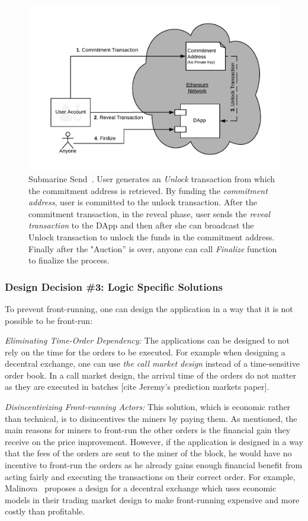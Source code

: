 \begin{figure}[h]
\centering
\includegraphics[width=0.5\linewidth]{figures/LibSubmarine.png}
\caption{ Submarine Send~\cite{libsubmarine}. User generates an \textit{Unlock} transaction from which the commitment address is retrieved. By funding the \textit{commitment address}, user is committed to the unlock transaction. After the commitment transaction, in the reveal phase, user sends the \textit{reveal transaction} to the DApp and then after she can broadcast the Unlock transaction to unlock the funds in the commitment address. Finally after the "Auction'' is over, anyone can call \textit{Finalize} function to finalize the process.  \label{fig:LibSubmarine}}
\end{figure}


\subsubsection{Design Decision \#3: Logic Specific Solutions\newline}
To prevent front-running, one can design the application in a way that it is not possible to be front-run:

\noindent\emph{Eliminating Time-Order Dependency:} The applications can be designed to not rely on the time for the orders to be executed. For example when designing a decentral exchange, one can use \emph{the call market design} instead of a time-sensitive order book. In a call market design, the arrival time of the orders do not matter as they are executed in batches [cite Jeremy's prediction markets paper]. 

\noindent\emph{Disincentivizing Front-running Actors:} This solution, which is economic rather than technical, is to disincentives the miners by paying them. As mentioned, the main reasons for miners to front-run the other orders is the financial gain they receive on the price improvement. However, if the application is designed in a way that the fees of the orders are sent to the miner of the block, he would have no incentive to front-run the orders as he already gains enough financial benefit from acting fairly and executing the transactions on their correct order. For example, Malinova~\cite{Malinova} proposes a design for a decentral exchange which uses economic models in their trading market design to make front-running expensive and more costly than profitable. 



